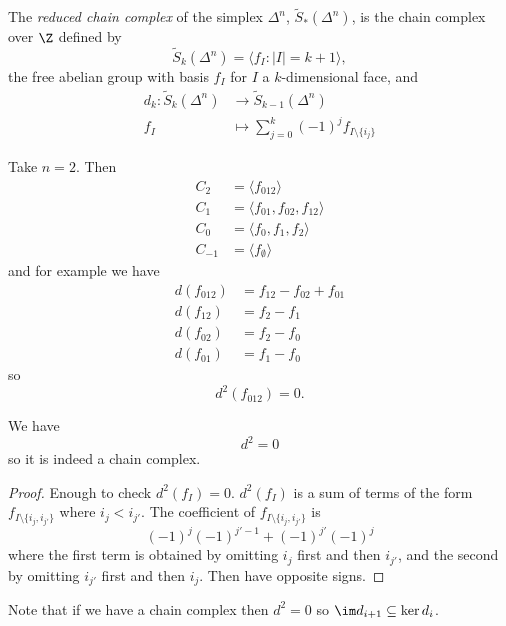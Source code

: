 \documentclass[a4paper]{article}
\begin{document}
\begin{definition}
  The \emph{reduced chain complex} of the simplex \(\Delta^n\), \(\widetilde S_*(\Delta^n)\), is the chain complex over \(\Z\) defined by
  \[
    \widetilde S_k(\Delta^n) = \langle f_I: |I| = k + 1 \rangle,
  \]
  the free abelian group with basis \(f_I\) for \(I\) a \(k\)-dimensional face, and
  \begin{align*}
    d_k: \widetilde S_k(\Delta^n) &\to \widetilde S_{k - 1}(\Delta^n) \\
    f_I &\mapsto \sum_{j = 0}^k (-1)^j f_{I \setminus \{i_j\}}
  \end{align*}
\end{definition}

\begin{eg}
  Take \(n = 2\). Then
  \begin{align*}
    C_2 &= \langle f_{012} \rangle \\
    C_1 &= \langle f_{01}, f_{02}, f_{12} \rangle \\
    C_0 &= \langle f_0, f_1, f_2 \rangle \\
    C_{-1} &= \langle f_\emptyset \rangle
  \end{align*}
  and for example we have
  \begin{align*}
    d(f_{012}) &= f_{12} - f_{02} + f_{01} \\
    d(f_{12}) &= f_2 - f_1 \\
    d(f_{02}) &= f_2 - f_0 \\
    d(f_{01}) &= f_1 - f_0
  \end{align*}
  so
  \[
    d^2(f_{012}) = 0.
  \]
\end{eg}

\begin{proposition}
  We have
  \[
    d^2 = 0
  \]
  so it is indeed a chain complex.
\end{proposition}

\begin{proof}
  Enough to check \(d^2(f_I) = 0\). \(d^2(f_I)\) is a sum of terms of the form \(f_{I \setminus \{i_j, i_{j'}\}}\) where \(i_j < i_{j'}\). The coefficient of \(f_{I \setminus \{i_j, i_{j'}\}}\) is
  \[
    (-1)^j (-1)^{j' - 1} + (-1)^{j'} (-1)^{j}
  \]
  where the first term is obtained by omitting \(i_j\) first and then \(i_{j'}\), and the second by omitting \(i_{j'}\) first and then \(i_j\). Then have opposite signs.
\end{proof}

Note that if we have a chain complex then \(d^2 = 0\) so \(\im d_{i + 1} \subseteq \ker d_i\).
\end{document}
